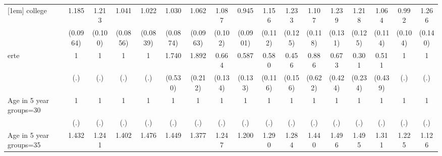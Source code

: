 {\begin{tabular}{l*{16}{c}}
[1em]
college             &       1.185\sym{*}  &       1.213\sym{*}  &       1.041         &       1.022         &       1.030         &       1.062         &       1.087         &       0.945         &       1.156         &       1.233\sym{*}  &       1.107         &       1.239\sym{*}  &       1.218         &       1.064         &       0.992         &       1.266\sym{*}  \\
                    &    (0.0964)         &     (0.100)         &    (0.0856)         &    (0.0839)         &    (0.0874)         &    (0.0963)         &     (0.102)         &    (0.0901)         &     (0.112)         &     (0.125)         &     (0.118)         &     (0.131)         &     (0.125)         &     (0.114)         &     (0.104)         &     (0.140)         \\
[1em]
erte                &           1         &           1         &           1         &           1         &       1.740         &       1.892\sym{***}&       0.664\sym{*}  &       0.587\sym{*}  &       0.580\sym{**} &       0.456\sym{*}  &       0.886         &       0.673         &       0.301         &       0.511         &           1         &           1         \\
                    &         (.)         &         (.)         &         (.)         &         (.)         &     (0.530)         &     (0.212)         &     (0.134)         &     (0.133)         &     (0.116)         &     (0.156)         &     (0.622)         &     (0.424)         &     (0.234)         &     (0.439)         &         (.)         &         (.)         \\
[1em]
Age in 5 year groups=30&           1         &           1         &           1         &           1         &           1         &           1         &           1         &           1         &           1         &           1         &           1         &           1         &           1         &           1         &           1         &           1         \\
                    &         (.)         &         (.)         &         (.)         &         (.)         &         (.)         &         (.)         &         (.)         &         (.)         &         (.)         &         (.)         &         (.)         &         (.)         &         (.)         &         (.)         &         (.)         &         (.)         \\
[1em]
Age in 5 year groups=35&       1.432\sym{***}&       1.241\sym{***}&       1.402\sym{***}&       1.476\sym{***}&       1.449\sym{***}&       1.377\sym{***}&       1.247\sym{**} &       1.200\sym{**} &       1.290\sym{***}&       1.284\sym{**} &       1.440\sym{***}&       1.496\sym{***}&       1.495\sym{***}&       1.311\sym{***}&       1.225\sym{*}  &       1.126         \\

\end{tabular}}
